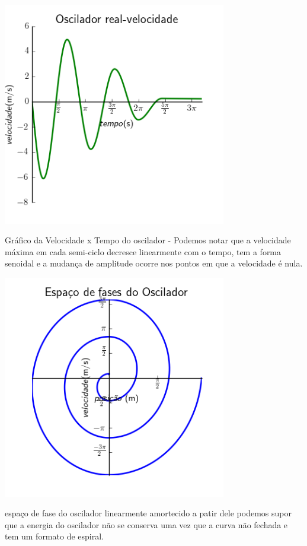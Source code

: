 \documentclass[a4paper]{article} %
\begin{document}
\begin{center}
	
	\includegraphics[width=3.84in,height=3.84in,keepaspectratio = false]{image1_2.png}
	
	\scriptsize Gr\'afico da Velocidade x Tempo do oscilador - Podemos notar que a velocidade m\'axima em cada semi-ciclo decresce linearmente com o tempo, tem a forma senoidal e a mudan\c{c}a de amplitude ocorre nos pontos em que a velocidade \'e nula.
\end{center}
 
\begin{center}
	
	\includegraphics[width=3.84in,height=3.84in,keepaspectratio = false]{image1_3.png}
	
	\scriptsize espa\c{c}o de fase do oscilador linearmente amortecido a patir dele podemos supor que a energia do oscilador n\~ao se conserva uma vez que a curva n\~ao fechada e tem um formato de espiral.
\end{center}
\end{document}
